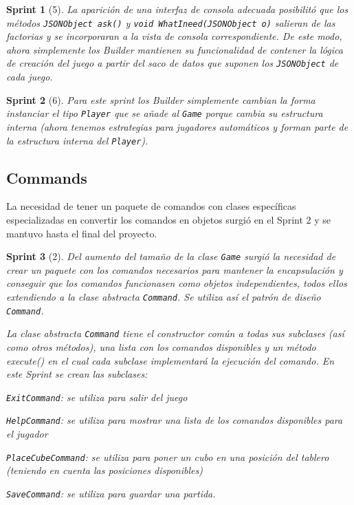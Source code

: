 \documentclass[12pt,a4paper,openright]{book}
\theoremstyle{break}
\newtheorem*{sprint}{Sprint}
\begin{document}
\begin{sprint}[5]
La aparición de una interfaz de consola adecuada posibilitó que los métodos \texttt{JSONObject ask()} y \texttt{void WhatIneed(JSONObject o)} salieran de las factorias y se incorporaran a la vista de consola correspondiente. De este modo, ahora simplemente los Builder mantienen su funcionalidad de contener la lógica de creación del juego a partir del saco de datos que suponen los \texttt{JSONObject} de cada juego.
\end{sprint}

\begin{sprint}[6]
Para este sprint los Builder simplemente cambian la forma instanciar el tipo \texttt{\texttt{Player}} que se añade al \texttt{Game} porque cambia su estructura interna (ahora tenemos estrategias para jugadores automáticos y forman parte de la estructura interna del \texttt{\texttt{Player}}).
\end{sprint}

\subsection{Commands}

La necesidad de tener un paquete de comandos con clases específicas especializadas en convertir los comandos en objetos surgió en el Sprint 2 y se mantuvo hasta el final del proyecto.

\begin{sprint}[2]
Del aumento del tamaño de la clase \texttt{Game} surgió la necesidad de crear un paquete con los comandos necesarios para mantener la encapsulación y conseguir que los comandos funcionasen como objetos independientes, todos ellos extendiendo a la clase abstracta \texttt{Command}. Se utiliza así el patrón de diseño \texttt{Command}.

La clase abstracta \texttt{Command} tiene el constructor común a todas sus subclases (así como otros métodos), una lista con los comandos disponibles y un método execute() en el cual cada subclase implementará la ejecución del comando. En este Sprint se crean las subclases:

\item \texttt{ExitCommand}: se utiliza para salir del juego

\item \texttt{HelpCommand}: se utiliza para mostrar una lista de los comandos disponibles para el jugador

\item \texttt{PlaceCubeCommand}: se utiliza para poner un cubo en una posición del tablero (teniendo en cuenta las posiciones disponibles)

\item \texttt{SaveCommand}: se utiliza para guardar una partida.
\end{sprint}
\end{document}
